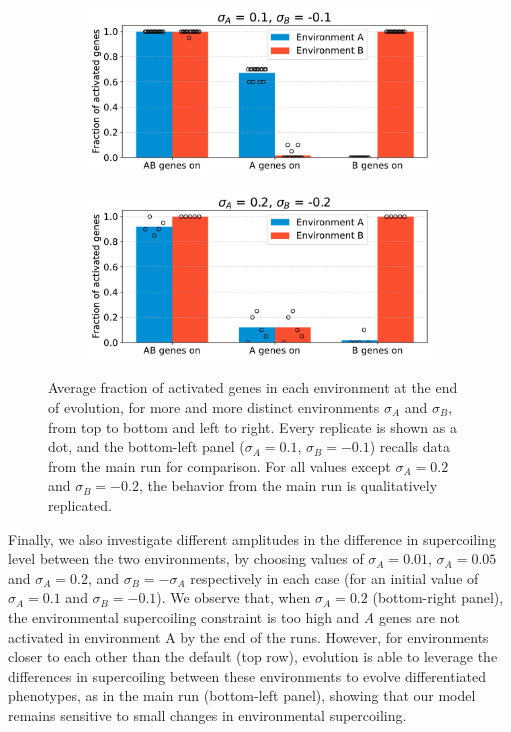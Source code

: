 \begin{figure}[H]
\begin{subfigure}[t]{0.49\textwidth}
\includegraphics[width=\textwidth]{alife/img/mean_activation_sigma.pdf}
\label{subfig:alife:param_sigma_3}
\end{subfigure}
\begin{subfigure}[t]{0.49\textwidth}
\includegraphics[width=\textwidth]{alife/img/mean_activation_sigma-0.2.pdf}
\label{subfig:alife:param_sigma_4}
\end{subfigure}
\caption[Parameter exploration in the proof-of-concept model: varying $\sigma_A$ and $\sigma_B$]{Average fraction of activated genes in each environment at the end of evolution, for more and more distinct environments $\sigma_A$ and $\sigma_B$, from top to bottom and left to right.
Every replicate is shown as a dot, and the bottom-left panel ($\sigma_A = 0.1$, $\sigma_B = -0.1$) recalls data from the main run for comparison.
For all values except $\sigma_A = 0.2$ and $\sigma_B = -0.2$, the behavior from the main run is qualitatively replicated.}
\label{fig:alife:param_sigma}
\end{figure}

Finally, we also investigate different amplitudes in the difference in supercoiling level between the two environments, by choosing values of $\sigma_A = 0.01$, $\sigma_A = 0.05$ and $\sigma_A = 0.2$, and $\sigma_B = -\sigma_A$ respectively in each case (for an initial value of $\sigma_A = 0.1$ and $\sigma_B = -0.1$).
We observe that, when $\sigma_A = 0.2$ (bottom-right panel), the environmental supercoiling constraint is too high and \emph{A} genes are not activated in environment A by the end of the runs.
However, for environments closer to each other than the default (top row), evolution is able to leverage the differences in supercoiling between these environments to evolve differentiated phenotypes, as in the main run (bottom-left panel), showing that our model remains sensitive to small changes in environmental supercoiling.

